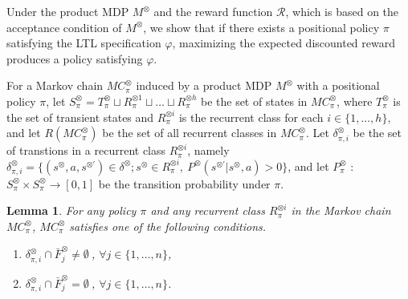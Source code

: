 \documentclass[letterpaper, 10 pt, conference]{ieeeconf}  %
\newtheorem{lemma}{Lemma}
\begin{document}
Under the product MDP $M^{\otimes}$ and the reward function $\mathcal{R}$, which is based on the acceptance condition of $ M^\otimes $, we show that if there exists a positional policy $\pi$ satisfying the LTL specification $\varphi$, maximizing the expected discounted reward produces a policy satisfying $\varphi$.

For a Markov chain $MC^{\otimes}_{\pi}$ induced by a product MDP $M^{\otimes}$ with a positional policy $\pi$, let $S^{\otimes}_{\pi}= T^{\otimes}_{\pi} \sqcup R^{\otimes 1}_{\pi} \sqcup \ldots \sqcup R^{\otimes h}_{\pi}$ be the set of states in $MC^{\otimes}_{\pi}$, where $T^{\otimes}_{\pi}$ is the set of transient states and $R^{\otimes i}_{\pi}$ is the recurrent class for each $i \in \{ 1, \ldots ,h \}$, and let $R(MC^{\otimes}_{\pi})$ be the set of all recurrent classes in $MC^{\otimes}_{\pi}$. Let $\delta^{\otimes}_{\pi,i}$ be the set of transtions in a recurrent class $R^{\otimes i}_{\pi}$, namely $\delta^{\otimes}_{\pi,i} = \{ (s^{\otimes},a,s^{\otimes \prime}) \in \delta^{\otimes} ; s^{\otimes} \in R^{\otimes i}_{\pi},\ P^{\otimes}(s^{\otimes \prime}|s^{\otimes},a) > 0 \}$, and let $P^{\otimes}_{\pi}$ : $S^{\otimes}_{\pi} \times S^{\otimes}_{\pi} \rightarrow [0,1]$ be the transition probability under $\pi$.

\begin{lemma}
  For any policy $\pi$ and any recurrent class $R^{\otimes i}_{\pi}$ in the Markov chain $MC^{\otimes}_{\pi}$,
  $MC^{\otimes}_{\pi}$ satisfies one of the following conditions.
  \vspace{2mm}
  \begin{enumerate}
    \item $\delta^{\otimes}_{\pi,i} \cap \bar{F}^{\otimes}_j \neq \emptyset\ $, $ \forall j \in \{ 1, \ldots ,n \}$,
    \item $\delta^{\otimes}_{\pi,i} \cap \bar{F}^{\otimes}_j = \emptyset\ $, $ \forall j \in \{ 1, \ldots ,n \}$.
  \end{enumerate}
  \label{lemma1}
\end{lemma}
\end{document}
